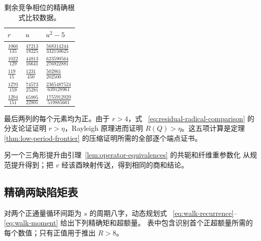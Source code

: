 \begin{table}[H]
\centering
\caption{剩余竞争相位的精确根式比较数据。}
\label{tab:residual-radical-data}
\begingroup
\renewcommand{\arraystretch}{1.35}
\begin{tabular}{lll}
\toprule
\(r\) & \(u\) & \(u^{2}-5\) \\
\midrule
\(\frac{1066}{135}\) & \(\frac{47213}{18225}\) & \(\frac{568314244}{332150625}\) \\
\(\frac{1022}{129}\) & \(\frac{44813}{16641}\) & \(\frac{623590564}{276922881}\) \\
\(\frac{119}{15}\) & \(\frac{1231}{450}\) & \(\frac{502861}{202500}\) \\
\(\frac{1270}{159}\) & \(\frac{74573}{25281}\) & \(\frac{2365487524}{639128961}\) \\
\(\frac{1204}{151}\) & \(\frac{65995}{22801}\) & \(\frac{1755912020}{519885601}\) \\
\bottomrule
\end{tabular}
\endgroup
\end{table}

最后两列的每个元素均为正。由于 \(r>4\)，式~
\eqref{eq:residual-radical-comparison} 的分支论证证明 \(r>\eta\)，Rayleigh
原理进而证明 \(R(Q)>\eta\)。这五项计算是定理~
\ref{thm:low-period-frontier} 的压缩证明所需的全部逐个端点证书。

另一个三角形提升由引理~\ref{lem:operator-equivalences} 的共轭和纤维重参数化
从规范提升得到；把 \(v\) 经该酉映射传送，得到相同的商和结论。

\subsection{精确两缺陷矩表}

对两个正通量循环间距为 \(s\) 的周期八字，动态规划式~
\eqref{eq:walk-recurrence}--\eqref{eq:walk-moment} 给出下列精确矩和超额量。
表中包含识别首个正超额量所需的每个数值；只有正值用于推出 \(R>8\)。

